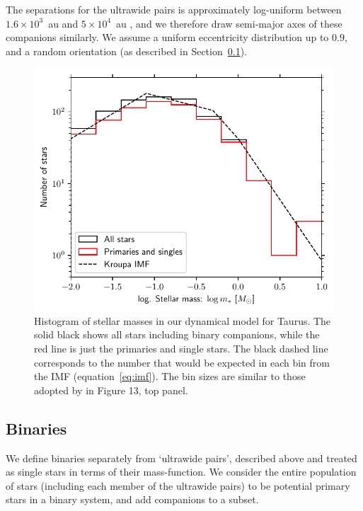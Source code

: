 \documentclass{aa}
\begin{document}
The separations for the ultrawide pairs is approximately log-uniform between $1.6\times 10^3$~au and $5\times 10^4$~au \citep[see Fig. 7 of][]{Joncour17}, and we therefore draw semi-major axes of these companions similarly. We assume a uniform eccentricity distribution up to $0.9$, and a random orientation (as described in Section~\ref{sec:binaries}). 


\begin{figure}
    \centering
    \includegraphics[width=\columnwidth]{Figures/model_mstars.pdf}
    \caption{Histogram of stellar masses in our dynamical model for Taurus. The solid black shows all stars including binary companions, while the red line is just the primaries and single stars. The black dashed line corresponds to the number that would be expected in each bin from the \citet{Kro01} IMF (equation~\ref{eq:imf}). The bin sizes are similar to those adopted by \citet{Luhman04} in Figure 13, top panel.}
    \label{fig:model_mstar}
\end{figure}

\subsection{Binaries}
\label{sec:binaries}


We define binaries separately from `ultrawide pairs', described above and treated as single stars in terms of their mass-function.   We consider the entire population of stars (including each member of the ultrawide pairs) to be potential primary stars in a binary system, and add companions to a subset. 
\end{document}
